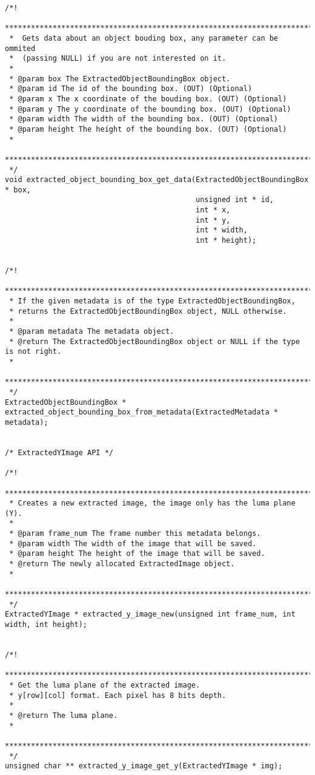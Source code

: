 \begin{lstlisting}
/*!
 *******************************************************************************
 *  Gets data about an object bouding box, any parameter can be ommited 
 *  (passing NULL) if you are not interested on it.
 *
 * @param box The ExtractedObjectBoundingBox object.
 * @param id The id of the bounding box. (OUT) (Optional)
 * @param x The x coordinate of the bouding box. (OUT) (Optional)
 * @param y The y coordinate of the bounding box. (OUT) (Optional)
 * @param width The width of the bounding box. (OUT) (Optional)
 * @param height The height of the bounding box. (OUT) (Optional)
 *
 *******************************************************************************
 */
void extracted_object_bounding_box_get_data(ExtractedObjectBoundingBox * box, 
                                            unsigned int * id,
                                            int * x,
                                            int * y,
                                            int * width,
                                            int * height);


/*!
 *********************************************************************************
 * If the given metadata is of the type ExtractedObjectBoundingBox,
 * returns the ExtractedObjectBoundingBox object, NULL otherwise.
 *
 * @param metadata The metadata object.
 * @return The ExtractedObjectBoundingBox object or NULL if the type is not right.
 *
 *********************************************************************************
 */
ExtractedObjectBoundingBox * extracted_object_bounding_box_from_metadata(ExtractedMetadata * metadata);


/* ExtractedYImage API */

/*!
 *******************************************************************************
 * Creates a new extracted image, the image only has the luma plane (Y).
 *
 * @param frame_num The frame number this metadata belongs.
 * @param width The width of the image that will be saved.
 * @param height The height of the image that will be saved.
 * @return The newly allocated ExtractedImage object.
 *
 *******************************************************************************
 */
ExtractedYImage * extracted_y_image_new(unsigned int frame_num, int width, int height);


/*!
 *******************************************************************************
 * Get the luma plane of the extracted image.
 * y[row][col] format. Each pixel has 8 bits depth.
 *
 * @return The luma plane.
 *
 *******************************************************************************
 */
unsigned char ** extracted_y_image_get_y(ExtractedYImage * img);



\end{lstlisting}

